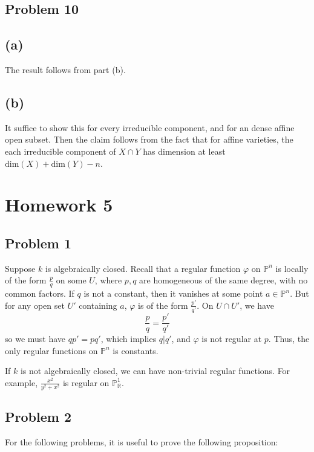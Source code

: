 \documentclass{article}
\theoremstyle{definition}
\theoremstyle{definition}
\theoremstyle{definition}
\theoremstyle{definition}
\theoremstyle{definition}
\theoremstyle{definition}
\theoremstyle{definition}
\begin{document}
\subsection*{Problem 10}
\subsection*{(a)}
The result follows from part (b).
\subsection*{(b)}
It suffice to show this for every irreducible component, and for an dense affine open subset. Then the claim follows from the fact that for affine varieties, the each irreducible component of $X\cap Y$ has dimension at least $\textrm{dim}(X)+\textrm{dim}(Y)- n$.


\section*{Homework 5}
\subsection*{Problem 1}
Suppose $k$ is algebraically closed. Recall that a regular function $\varphi$ on $\mathbb{P}^n$ is locally of the form $\frac{p}{q}$ on some $U$, where $p,q$ are homogeneous of the same degree, with no common factors. If $q$ is not a constant, then it vanishes at some point $a\in \mathbb{P}^n$. But for any open set $U'$ containing $a$, $\varphi$ is of the form $\frac{p'}{q'}$. On $U\cap U'$, we have 
\[\frac{p}{q}=\frac{p'}{q'}\]
so we must have $qp'=pq'$, which implies $q|q'$, and $\varphi$ is not regular at $p$. Thus, the only regular functions on $\mathbb{P}^n$ is constants. 

If $k$ is not algebraically closed, we can have non-trivial regular functions. For example, $\frac{x^2}{y^2+x^2}$ is regular on $\mathbb{P}_{\mathbb{R}}^1$.

\subsection*{Problem 2}
For the following problems, it is useful to prove the following proposition:
\end{document}
